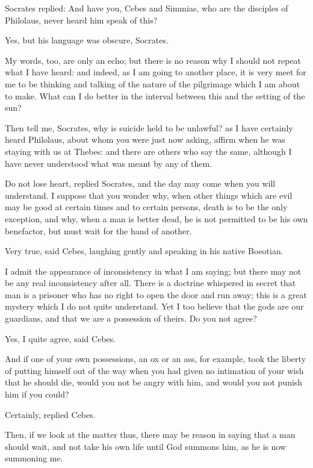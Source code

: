 Socrates replied: And have you, Cebes and Simmias, who are the disciples
of Philolaus, never heard him speak of this?

Yes, but his language was obscure, Socrates.

My words, too, are only an echo; but there is no reason why I should not
repeat what I have heard: and indeed, as I am going to another place,
it is very meet for me to be thinking and talking of the nature of
the pilgrimage which I am about to make. What can I do better in the
interval between this and the setting of the sun?

Then tell me, Socrates, why is suicide held to be unlawful? as I have
certainly heard Philolaus, about whom you were just now asking, affirm
when he was staying with us at Thebes: and there are others who say the
same, although I have never understood what was meant by any of them.

Do not lose heart, replied Socrates, and the day may come when you will
understand. I suppose that you wonder why, when other things which are
evil may be good at certain times and to certain persons, death is to
be the only exception, and why, when a man is better dead, he is not
permitted to be his own benefactor, but must wait for the hand of
another.

Very true, said Cebes, laughing gently and speaking in his native
Boeotian.

I admit the appearance of inconsistency in what I am saying; but
there may not be any real inconsistency after all. There is a doctrine
whispered in secret that man is a prisoner who has no right to open
the door and run away; this is a great mystery which I do not quite
understand. Yet I too believe that the gods are our guardians, and that
we are a possession of theirs. Do you not agree?

Yes, I quite agree, said Cebes.

And if one of your own possessions, an ox or an ass, for example, took
the liberty of putting himself out of the way when you had given no
intimation of your wish that he should die, would you not be angry with
him, and would you not punish him if you could?

Certainly, replied Cebes.

Then, if we look at the matter thus, there may be reason in saying that
a man should wait, and not take his own life until God summons him, as
he is now summoning me.

